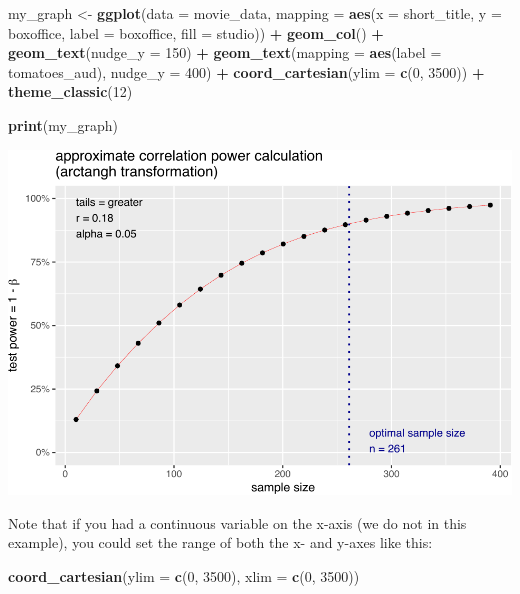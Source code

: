 \documentclass[
]{krantz}
\makeatletter
\newenvironment{Shaded}{\begin{snugshade}}{\end{snugshade}}
\newcommand{\DataTypeTok}[1]{\textcolor[rgb]{0.27,0.27,0.27}{#1}}
\newcommand{\DecValTok}[1]{\textcolor[rgb]{0.06,0.06,0.06}{#1}}
\newcommand{\KeywordTok}[1]{\textcolor[rgb]{0.27,0.27,0.27}{\textbf{#1}}}
\newcommand{\NormalTok}[1]{#1}
\newcommand{\OperatorTok}[1]{\textcolor[rgb]{0.43,0.43,0.43}{\textbf{#1}}}
\newcommand{\StringTok}[1]{\textcolor[rgb]{0.5,0.5,0.5}{#1}}
\newenvironment{kframe}{%
\medskip{}
\setlength{\fboxsep}{.8em}
 \def\at@end@of@kframe{}%
 \ifinner\ifhmode%
  \def\at@end@of@kframe{\end{minipage}}%
  \begin{minipage}{\columnwidth}%
 \fi\fi%
 \def\FrameCommand##1{\hskip\@totalleftmargin \hskip-\fboxsep
 \colorbox{shadecolor}{##1}\hskip-\fboxsep
     \hskip-\linewidth \hskip-\@totalleftmargin \hskip\columnwidth}%
 \MakeFramed {\advance\hsize-\width
   \@totalleftmargin\z@ \linewidth\hsize
   \@setminipage}}%
 {\par\unskip\endMakeFramed%
 \at@end@of@kframe}
\renewenvironment{Shaded}{\begin{kframe}}{\end{kframe}}
\makeatother
\begin{document}
\begin{Shaded}
\begin{Highlighting}[]
\NormalTok{my_graph <-}\StringTok{ }\KeywordTok{ggplot}\NormalTok{(}\DataTypeTok{data =}\NormalTok{ movie_data,}
           \DataTypeTok{mapping =} \KeywordTok{aes}\NormalTok{(}\DataTypeTok{x =}\NormalTok{ short_title,}
                         \DataTypeTok{y =}\NormalTok{ boxoffice,}
                         \DataTypeTok{label =}\NormalTok{ boxoffice, }
                         \DataTypeTok{fill =}\NormalTok{ studio)) }\OperatorTok{+}
\StringTok{  }\KeywordTok{geom_col}\NormalTok{() }\OperatorTok{+}
\StringTok{  }\KeywordTok{geom_text}\NormalTok{(}\DataTypeTok{nudge_y =} \DecValTok{150}\NormalTok{)  }\OperatorTok{+}
\StringTok{  }\KeywordTok{geom_text}\NormalTok{(}\DataTypeTok{mapping =} \KeywordTok{aes}\NormalTok{(}\DataTypeTok{label =}\NormalTok{ tomatoes_aud), }
            \DataTypeTok{nudge_y =} \DecValTok{400}\NormalTok{) }\OperatorTok{+}
\StringTok{  }\KeywordTok{coord_cartesian}\NormalTok{(}\DataTypeTok{ylim =} \KeywordTok{c}\NormalTok{(}\DecValTok{0}\NormalTok{, }\DecValTok{3500}\NormalTok{)) }\OperatorTok{+}
\StringTok{  }\KeywordTok{theme_classic}\NormalTok{(}\DecValTok{12}\NormalTok{)}


\KeywordTok{print}\NormalTok{(my_graph)}
\end{Highlighting}
\end{Shaded}

\includegraphics[width=0.65\linewidth]{bookdown_files/figure-latex/unnamed-chunk-260-1}

Note that if you had a continuous variable on the x-axis (we do not in this example), you could set the range of both the x- and y-axes like this:

\begin{Shaded}
\begin{Highlighting}[]
\KeywordTok{coord_cartesian}\NormalTok{(}\DataTypeTok{ylim =} \KeywordTok{c}\NormalTok{(}\DecValTok{0}\NormalTok{, }\DecValTok{3500}\NormalTok{),}
                \DataTypeTok{xlim =} \KeywordTok{c}\NormalTok{(}\DecValTok{0}\NormalTok{, }\DecValTok{3500}\NormalTok{))}
\end{Highlighting}
\end{Shaded}
\end{document}
